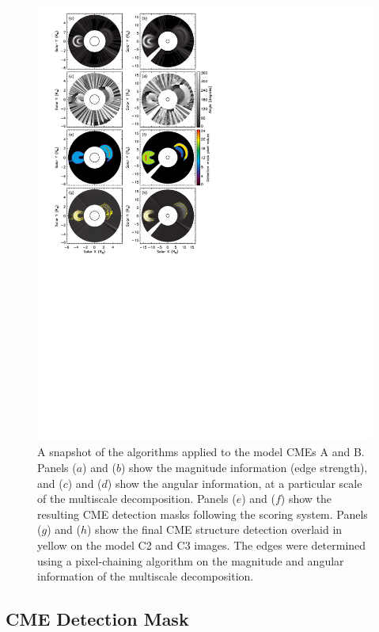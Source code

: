 \documentclass[namedreferences]{SolarPhysics}
\begin{document}
\begin{article}
\begin{figure}[!p*]
\centerline{\includegraphics[scale=1.2, clip=true, trim=0 330 260 10]{images/figure_model8.pdf}}
\caption{A snapshot of the algorithms applied to the model CMEs A and B. Panels ($a$) and ($b$) show the magnitude information (edge strength), and ($c$) and ($d$) show the angular information, at a particular scale of the multiscale decomposition. Panels ($e$) and ($f$) show the resulting CME detection masks following the scoring system. Panels ($g$) and ($h$) show the final CME structure detection overlaid in yellow on the model C2 and C3 images. The edges were determined using a pixel-chaining algorithm on the magnitude and angular information of the multiscale decomposition.}
\label{figure_model8}
\end{figure}

\subsection{CME Detection Mask}


\end{article}
\end{document}
